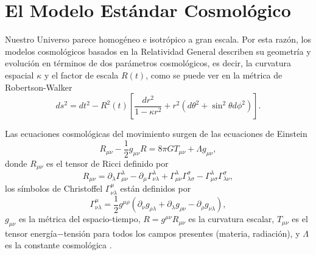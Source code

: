 \section*{El Modelo Estándar Cosmológico}

Nuestro Universo parece homogéneo e isotrópico a gran escala. Por esta razón, los modelos cosmológicos basados en la Relatividad General describen su geometría y evolución en términos de dos parámetros cosmológicos, es decir, la curvatura espacial $\kappa$ y el factor de escala $R(t)$, como se puede ver en la métrica de Robertson-Walker
\begin{equation}
ds^2 = dt^2 - R^2(t) \left[  \frac{dr^2}{1-\kappa r^2} + r^2 (d\theta^2 + \sin^2 \theta d\phi^2)  \right].
\label{RWmetric}
\end{equation}


Las ecuaciones cosmológicas del movimiento surgen de las ecuaciones de Einstein
\begin{equation}
R_{\mu \nu} - \frac{1}{2} g_{\mu \nu} R = 8 \pi G T_{\mu \nu} + \Lambda g_{\mu \nu} ,
\end{equation}
donde $R_{\mu \nu}$ es el tensor de Ricci definido por
\begin{equation}
R_{\mu \nu} = \partial_\lambda \Gamma^\lambda_{\mu \nu} - \partial_\mu \Gamma^\lambda_{\nu \lambda} + \Gamma^\lambda_{\mu \nu} \Gamma^\sigma_{\lambda \sigma} -  \Gamma^\lambda_{\mu \sigma} \Gamma^\sigma_{\lambda \nu},
\end{equation} 
los símbolos de Christoffel $\Gamma^\mu_{\nu \lambda}$ están definidos por
\begin{equation}
\Gamma^\mu_{\nu \lambda} = \frac{1}{2} g^{\mu \rho} (\partial_\nu g_{\rho \lambda}  + \partial_\lambda g_{\rho \nu} - \partial_\rho g_{\nu \lambda} ), 
\end{equation}
$g_{\mu \nu}$ es la métrica del espacio-tiempo, $R = g^{\mu \nu} R_{\mu \nu}$ es la curvatura escalar, $T_{\mu \nu}$ es el tensor energía$-$tensión para todos los campos presentes (materia, radiación), y $\Lambda$ es la constante cosmológica \cite{gliner1966algebraic,zel1968cosmological}.

